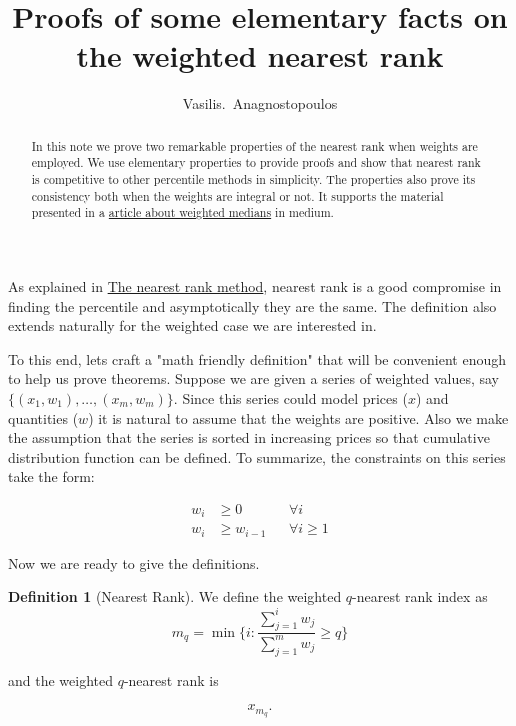 \documentclass[a4paper,11pt]{article} %
\author{Vasilis.~Anagnostopoulos}
\title{Proofs of some elementary facts on the weighted nearest rank}
\theoremstyle{definition}
\newtheorem{defn}{Definition}[section]
\theoremstyle{remark}
\begin{document}
\maketitle
\begin{abstract}
	In this note we prove two remarkable properties of the nearest rank when weights are employed. We use elementary properties to provide proofs and show that nearest rank is competitive to other percentile methods in simplicity. The properties also prove its consistency both when the weights are integral or not.
	It supports the material presented in a \href{http://www.medium.com}{article about weighted medians} in medium.
\end{abstract}

As explained in \href{https://en.wikipedia.org/wiki/Percentile#The_nearest-rank_method}{The nearest rank method}, nearest rank is a good compromise in finding the percentile and asymptotically they are the same. The definition also extends naturally for the weighted case we are interested in.
\par
To this end, lets craft a "math friendly definition" that will be convenient enough to help us prove theorems. Suppose we are given  a series of weighted values, say $\{(x_{1},w_{1}),\ldots, (x_{m}, w_{m})\}$.  Since this series could model prices ($x$) and quantities ($w$) it is natural
to assume that the weights are positive. Also we make the assumption that the series is sorted in increasing prices so that cumulative distribution function can be defined.
To summarize, the constraints on this series take the form:

\begin{align}
w_{i} &\ge 0   &&\forall i  \label{eq1}  \\
w_{i} &\ge w_{i-1}  && \forall i \ge 1 \label{eq2}
\end{align}

Now we are ready to give the definitions.
\begin{defn}[Nearest Rank]
\label{dfnnearestrank}
We define the
weighted $q$-nearest rank index as
\begin{equation}
m_{q} = \min \{ i : \frac{\sum_{j=1}^{i} w_{j}}{\sum_{j=1}^{m} w_{j}} \ge q \}
\end{equation}

and the weighted $q$-nearest rank is

\begin{equation}
x_{m_{q}}.
\end{equation}
\end{defn}
\end{document}
